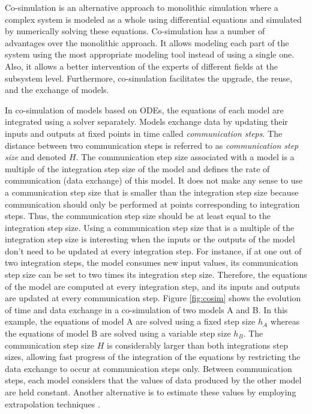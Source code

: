Co-simulation is an alternative approach to monolithic simulation where a complex system is modeled as a whole using differential equations and simulated by numerically solving these equations. Co-simulation has a number of advantages over the monolithic approach. It allows modeling each part of the system using the most appropriate modeling tool instead of using a single one. Also, it allows a better intervention of the experts of different fields at the subsystem level. Furthermore, co-simulation facilitates the upgrade, the reuse, and the exchange of models. 

In co-simulation of models based on ODEs, the equations of each model are integrated using a solver separately. 
Models exchange data by updating their inputs and outputs at fixed points in time called \textit{communication steps}. The distance between two communication steps is referred to as \textit{communication step size} and denoted $H$. The communication step size associated with a model is a multiple of the integration step size of the model and defines the rate of communication (data exchange) of this model. It does not make any sense to use a communication step size that is smaller than the integration step size because communication should only be performed at points corresponding to integration steps. Thus, the communication step size should be at least equal to the integration step size. Using a communication step size that is a multiple of the integration step size is interesting when the inputs or the outputs of the model don't need to be updated at every integration step. For instance, if at one out of two integration steps, the model consumes new input values, its communication step size can be set to two times its integration step size. Therefore, the equations of the model are computed at every integration step, and its inputs and outputs are updated at every communication step. 
Figure \ref{fig:cosim} shows the evolution of time and data exchange in a co-simulation of two models A and B. In this example, the equations of model A are solved using a fixed step size $h_A$ whereas the equations of model B are solved using a variable step size $h_B$. The communication step size $H $ is considerably larger than both integrations step sizes, allowing fast progress of the integration of the equations by restricting the data exchange to occur at communication steps only. Between communication steps, each model considers that the values of data produced by the other model are held constant. Another alternative is to estimate these values by employing extrapolation techniques \cite{benkhaled:2014_context,benkhaled:2017}.

